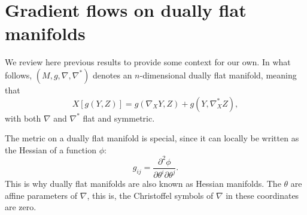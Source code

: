 \documentclass{amsart}
\theoremstyle{definition}
\begin{document}





\section{Gradient flows on dually flat manifolds}\label{sec:gradientflows}

We review here previous results to provide some context for our own. In what follows, $(M,g,\nabla,\nabla^*)$ denotes an $n$-dimensional dually flat manifold, meaning that 
\begin{equation*}
    X[g(Y,Z)]=g(\nabla_XY,Z)+g(Y,\nabla^*_XZ),
\end{equation*}
with both $\nabla$ and $\nabla^*$ flat and symmetric. 

The metric on a dually flat manifold is special, since it can locally be written as the Hessian of a function $\phi$:
\begin{equation*}
    g_{ij}=\frac{\partial^2\phi}{\partial\theta^i\partial\theta^j}.
\end{equation*}
This is why dually flat manifolds are also known as Hessian manifolds. The $\theta$ are affine parameters of $\nabla$, this is, the Christoffel symbols of $\nabla$ in these coordinates are zero.
\end{document}
